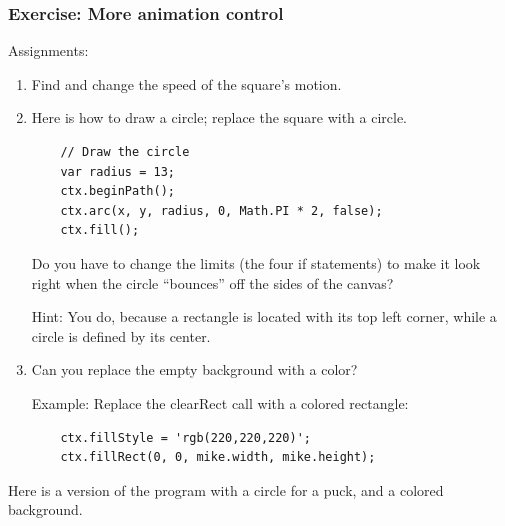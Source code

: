 \documentclass[11pt]{article}
\begin{document}
\subsubsection{Exercise: More animation control}

Assignments:

\begin{enumerate}

\item Find and change the speed of the square's motion.

\item Here is how to draw a circle; replace the square with a circle.

\begin{verbatim}
    // Draw the circle
    var radius = 13;
    ctx.beginPath();
    ctx.arc(x, y, radius, 0, Math.PI * 2, false);
    ctx.fill();
\end{verbatim}

Do you have to change the limits (the four if statements) to make it
look right when the circle ``bounces'' off the sides of the canvas?

Hint: You do, because a rectangle is located with its top left corner,
while a circle is defined by its center.

\item Can you replace the empty background with a color?

Example: Replace the clearRect call with a colored rectangle:

\begin{verbatim}
    ctx.fillStyle = 'rgb(220,220,220)';
    ctx.fillRect(0, 0, mike.width, mike.height);
\end{verbatim}

\end{enumerate}

Here is a version of the program with a circle for a puck, and a
colored background.
\end{document}
